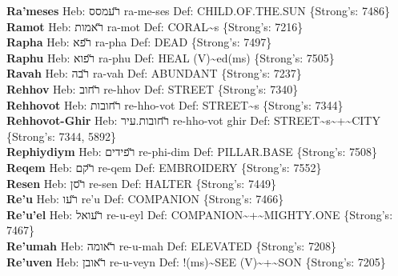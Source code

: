 {\textbf{Ra'meses} Heb: {\large\H רעמסס} ra-me-ses Def: CHILD.OF.THE.SUN \{Strong's: 7486\}\hfill{}\\

\textbf{Ramot} Heb: {\large\H ראמות} ra-mot Def: CORAL\textasciitilde{}s \{Strong's: 7216\}\hfill{}\\

\textbf{Rapha} Heb: {\large\H רפא} ra-pha Def: DEAD \{Strong's: 7497\}\hfill{}\\

\textbf{Raphu} Heb: {\large\H רפוא} ra-phu Def: HEAL (V)\textasciitilde{}ed(ms) \{Strong's: 7505\}\hfill{}\\

\textbf{Ravah} Heb: {\large\H רבה} ra-vah Def: ABUNDANT \{Strong's: 7237\}\hfill{}\\

\textbf{Rehhov} Heb: {\large\H רחוב} re-hhov Def: STREET \{Strong's: 7340\}\hfill{}\\

\textbf{Rehhovot} Heb: {\large\H רחובות} re-hho-vot Def: STREET\textasciitilde{}s \{Strong's: 7344\}\hfill{}\\

\textbf{Rehhovot-Ghir} Heb: {\large\H רחובות.עיר} re-hho-vot ghir Def: STREET\textasciitilde{}s\textasciitilde{}+\textasciitilde{}CITY \{Strong's: 7344, 5892\}\hfill{}\\

\textbf{Rephiydiym} Heb: {\large\H רפידים} re-phi-dim Def: PILLAR.BASE \{Strong's: 7508\}\hfill{}\\

\textbf{Reqem} Heb: {\large\H רקם} re-qem Def: EMBROIDERY \{Strong's: 7552\}\hfill{}\\

\textbf{Resen} Heb: {\large\H רסן} re-sen Def: HALTER \{Strong's: 7449\}\hfill{}\\

\textbf{Re'u} Heb: {\large\H רעו} re'u Def: COMPANION \{Strong's: 7466\}\hfill{}\\

\textbf{Re'u'el} Heb: {\large\H רעואל} re-u-eyl Def: COMPANION\textasciitilde{}+\textasciitilde{}MIGHTY.ONE \{Strong's: 7467\}\hfill{}\\

\textbf{Re'umah} Heb: {\large\H ראומה} re-u-mah Def: ELEVATED \{Strong's: 7208\}\hfill{}\\

\textbf{Re'uven} Heb: {\large\H ראובן} re-u-veyn Def: !(ms)\textasciitilde{}SEE (V)\textasciitilde{}+\textasciitilde{}SON \{Strong's: 7205\}\hfill{}\\

}
